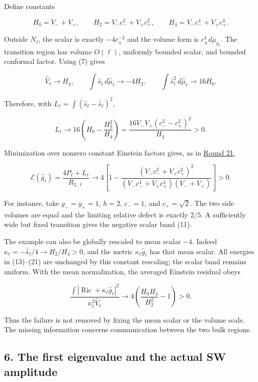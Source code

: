 \documentclass[
  11pt,
]{article}
\begin{document}
Define constants

\[
 H_0=V_-+V_+,\qquad H_2=V_-c_-^2+V_+c_+^2,\qquad
 H_4=V_-c_-^4+V_+c_+^4.
 \tag{18}
\]

Outside \(N_\ell\), the scalar is exactly \(-4c_\pm^{-2}\) and the
volume form is \(c_\pm^4d\mu_{g_\ell}\). The transition region has
volume \(O(\ell)\), uniformly bounded scalar, and bounded conformal
factor. Using (7) gives

\[
 \widehat V_\ell\to H_4,\qquad
 \int\widehat s_\ell\,d\widehat\mu_\ell\to-4H_2,\qquad
 \int\widehat s_\ell^2\,d\widehat\mu_\ell\to16H_0.
 \tag{19}
\]

Therefore, with
\(L_\ell=\int(\widehat s_\ell-\overline{\widehat s}_\ell)^2\),

\[
 \boxed{L_\ell\longrightarrow
 16\left(H_0-\frac{H_2^2}{H_4}\right)
 =\frac{16V_-V_+(c_-^2-c_+^2)^2}{H_4}>0.}
 \tag{20}
\]

Minimization over nonzero constant Einstein factors gives, as in
\href{round21_comparison.md}{Round 21},

\[
 \mathcal E(\widehat g_\ell)
 =\frac{4P_\ell+L_\ell}{R_{2,\ell}}
 \longrightarrow
 \boxed{4\left[1-
 \frac{(V_-c_-^2+V_+c_+^2)^2}
 {(V_-c_-^4+V_+c_+^4)(V_-+V_+)}\right]}>0.
 \tag{21}
\]

For instance, take \(g_-=g_+=1\), \(h=2\), \(c_-=1\), and
\(c_+=\sqrt2\). The two side volumes are equal and the limiting relative
defect is exactly \(2/5\). A sufficiently wide but fixed transition
gives the negative scalar band (11).

The example can also be globally rescaled to mean scalar \(-4\). Indeed
\(\kappa_\ell=-\overline{\widehat s}_\ell/4\to H_2/H_4>0\), and the
metric \(\kappa_\ell\widehat g_\ell\) has that mean scalar. All energies
in (13)--(21) are unchanged by this constant rescaling; the scalar band
remains uniform. With the mean normalization, the averaged Einstein
residual obeys

\[
 \frac{\int|\operatorname{Ric}+\kappa_\ell\widehat g_\ell|^2}
      {\kappa_\ell^2\widehat V_\ell}
 \longrightarrow4\left(\frac{H_0H_4}{H_2^2}-1\right)>0.
 \tag{22}
\]

Thus the failure is not removed by fixing the mean scalar or the volume
scale. The missing information concerns communication between the two
bulk regions.

\hypertarget{the-first-eigenvalue-and-the-actual-sw-amplitude}{%
\subsection{6. The first eigenvalue and the actual SW
amplitude}\label{the-first-eigenvalue-and-the-actual-sw-amplitude}}
\end{document}
